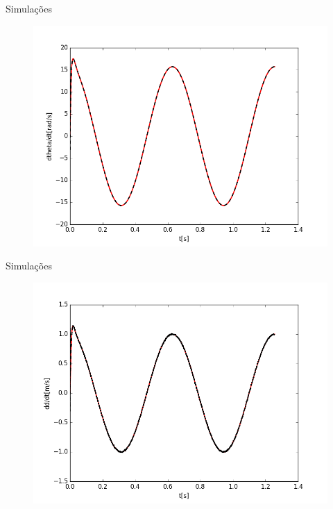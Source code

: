\documentclass[25pt,landscape]{beamer}
\begin{document}
\begin{frame}{Simula\c{c}\~oes}
	\begin{figure}[!h]
        \centering
        \includegraphics[scale=0.45]{Python/dtheta.png}
    \end{figure}
\end{frame}

\begin{frame}{Simula\c{c}\~oes}
	\begin{figure}[!h]
        \centering
        \includegraphics[scale=0.45]{Python/dd.png}
    \end{figure}
\end{frame}
\end{document}
